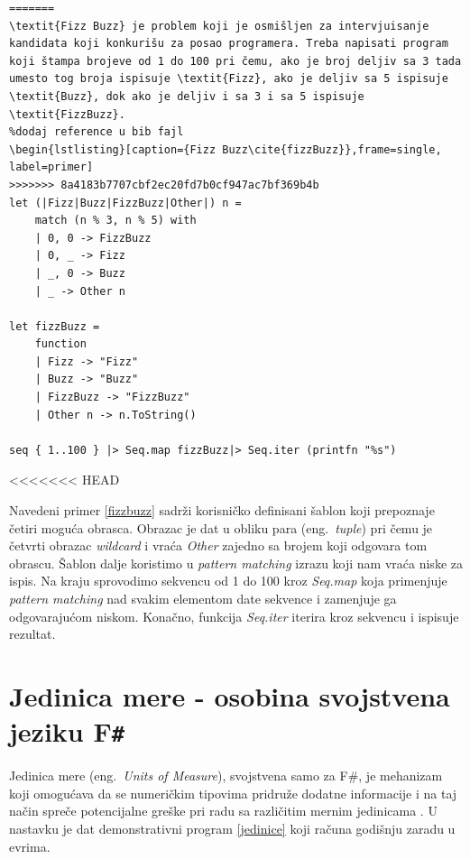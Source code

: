 \documentclass[a4paper]{article}
\begin{document}
\begin{lstlisting}[caption={Fizz Buzz \cite{fizzBuzz}},frame=single, label=fizzbuzz]
=======
\textit{Fizz Buzz} je problem koji je osmišljen za intervjuisanje kandidata koji konkurišu za posao programera. Treba napisati program koji štampa brojeve od 1 do 100 pri čemu, ako je broj deljiv sa 3 tada umesto tog broja ispisuje \textit{Fizz}, ako je deljiv sa 5 ispisuje \textit{Buzz}, dok ako je deljiv i sa 3 i sa 5 ispisuje \textit{FizzBuzz}.
%dodaj reference u bib fajl 
\begin{lstlisting}[caption={Fizz Buzz\cite{fizzBuzz}},frame=single, label=primer]
>>>>>>> 8a4183b7707cbf2ec20fd7b0cf947ac7bf369b4b
let (|Fizz|Buzz|FizzBuzz|Other|) n =
    match (n % 3, n % 5) with
    | 0, 0 -> FizzBuzz
    | 0, _ -> Fizz
    | _, 0 -> Buzz
    | _ -> Other n

let fizzBuzz =
    function
    | Fizz -> "Fizz"
    | Buzz -> "Buzz"
    | FizzBuzz -> "FizzBuzz"
    | Other n -> n.ToString()

seq { 1..100 } |> Seq.map fizzBuzz|> Seq.iter (printfn "%s")
\end{lstlisting}
<<<<<<< HEAD

Navedeni primer \ref{fizzbuzz} sadrži korisničko definisani šablon koji prepoznaje četiri moguća obrasca. Obrazac je dat u obliku para (eng.~{\em tuple}) pri čemu je četvrti obrazac \textit{wildcard} i vraća \textit{Other} zajedno sa brojem koji odgovara tom obrascu. Šablon dalje koristimo u \textit{pattern matching} izrazu koji nam vraća niske za ispis. Na kraju sprovodimo sekvencu od 1 do 100 kroz \textit{Seq.map} koja primenjuje \textit{pattern matching} nad svakim elementom date sekvence i zamenjuje ga odgovarajućom niskom. Konačno, funkcija \textit{Seq.iter} iterira kroz sekvencu i ispisuje rezultat.

\section{Jedinica mere - osobina svojstvena jeziku F\texttt{\#}}
Jedinica mere (eng.~{\em Units of Measure}), svojstvena samo za F\#, je mehanizam koji omogućava da se numeričkim tipovima pridruže dodatne informacije i na taj način spreče potencijalne greške pri radu sa različitim mernim jedinicama \cite{unitsOfMeasure}. U nastavku je dat demonstrativni program \ref{jedinice} koji računa godišnju zaradu u evrima. \\
\end{document}
